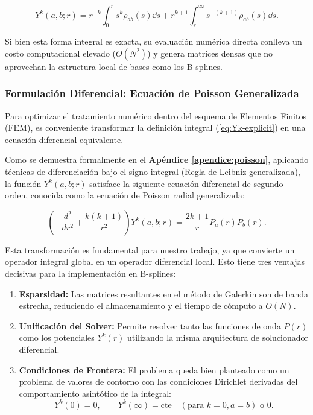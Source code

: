 \documentclass[12pt, a4paper, oneside, spanish]{book}
\begin{document}
\begin{equation}
\label{eq:Yk-explicit}
Y^k(a,b;r) = r^{-k}\int_0^r s^k \rho_{ab}(s) \dd{s} + r^{k+1} \int_r^{\infty} s^{-(k+1)} \rho_{ab}(s)\dd{s}.
\end{equation}

Si bien esta forma integral es exacta, su evaluación numérica directa conlleva un costo computacional elevado ($O(N^2)$) y genera matrices densas que no aprovechan la estructura local de bases como los B-splines.

\subsubsection{Formulación Diferencial: Ecuación de Poisson Generalizada}

Para optimizar el tratamiento numérico dentro del esquema de Elementos Finitos (FEM), es conveniente transformar la definición integral (\ref{eq:Yk-explicit}) en una ecuación diferencial equivalente.

Como se demuestra formalmente en el \textbf{Apéndice \cref{apendice:poisson}}, aplicando técnicas de diferenciación bajo el signo integral (Regla de Leibniz generalizada), la función $Y^k(a,b;r)$ satisface la siguiente ecuación diferencial de segundo orden, conocida como la ecuación de Poisson radial generalizada:

\begin{equation}
\label{eq:poisson-radial}
    \left( -\frac{d^2}{dr^2} + \frac{k(k+1)}{r^2} \right) Y^k(a,b;r) = \frac{2k+1}{r} P_a(r)P_b(r).
\end{equation}

Esta transformación es fundamental para nuestro trabajo, ya que convierte un operador integral global en un operador diferencial local. Esto tiene tres ventajas decisivas para la implementación en B-splines:

\begin{enumerate}
    \item \textbf{Esparsidad:} Las matrices resultantes en el método de Galerkin son de banda estrecha, reduciendo el almacenamiento y el tiempo de cómputo a $O(N)$.
    \item \textbf{Unificación del Solver:} Permite resolver tanto las funciones de onda $P(r)$ como los potenciales $Y^k(r)$ utilizando la misma arquitectura de solucionador diferencial.
    \item \textbf{Condiciones de Frontera:} El problema queda bien planteado como un problema de valores de contorno con las condiciones Dirichlet derivadas del comportamiento asintótico de la integral:
    \begin{equation}
        Y^k(0) = 0, \quad \quad Y^k(\infty) = \text{cte} \quad (\text{para } k=0, a=b) \text{ o } 0.
    \end{equation}
\end{enumerate}
\end{document}
